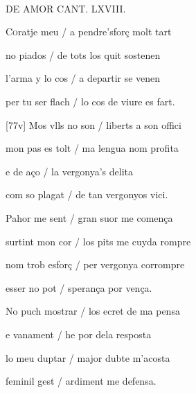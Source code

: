 \documentclass[12pt]{article}
\renewcommand{\espaiAbansEtiquetaPoema}{\vspace{0ex}}
\begin{document}
\begin{estrofa}

\espaiAbansEtiquetaPoema

\\

\begin{rubrica}

DE AMOR CANT. LXVIII.

\end{rubrica}

\end{estrofa}


\begin{estrofa}

 C\textsc{o}ratje meu / a pendre'sfor\c{c} molt tart

 no piados / de tots los quit sostenen

 l'arma y lo cos / a departir se venen

 per tu ser flach / lo cos de viure es fart.

 [77v] Mos vlls no son / liberts a son offici

 mon pas es tolt / ma lengua nom profita

 e de a\c{c}o / la vergonya's delita

 com so plagat / de tan vergonyos vici.

\end{estrofa}



\begin{estrofa}

 Pahor me sent / gran suor me comen\c{c}a

 surtint mon cor / los pits me cuyda rompre

 nom trob esfor\c{c} / per vergonya corrompre

 esser no pot / speran\c{c}a por ven\c{c}a.

 No puch mostrar / los ecret de ma pensa

 e vanament / he por dela resposta

 lo meu duptar / major dubte m'acosta

 feminil gest / ardiment me defensa.

\end{estrofa}
\end{document}
